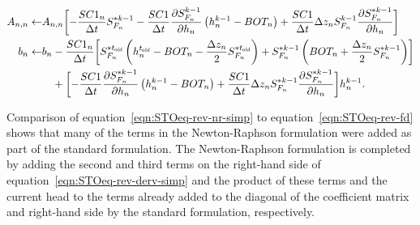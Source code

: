 \begin{equation}
	\label{eqn:STOeq-rev-nr-simp}
	\begin{split}
		A_{n,n} \leftarrow & A_{n,n} \biggl[ -\frac{SC1_n}{\Delta t}  S_{F_n}^{\ast k-1} - \frac{SC1}{\Delta t} \frac{\partial S_{F_n}^{k-1}}{\partial h_n} \left( h_n^{k-1} - BOT_n \right) + \frac{SC1}{\Delta t} \Delta z_n S_{F_n}^{k-1}  \frac{\partial S_{F_n}^{\ast k-1}}{\partial h_n} \biggr]  \\
		b_n \leftarrow & b_n - \frac{SC1_n}{\Delta t} \biggl[ S_{F_n}^{\ast t_\mathit{\kern -0.07em old}} \left( h_n^{t_\mathit{\kern -0.07em old}} - BOT_n - \frac{\Delta z_n}{2} S_{F_n}^{\ast t_\mathit{\kern -0.07em old}} \right) + S_{F_n}^{\ast k-1} \left( BOT_n + \frac{\Delta z_n}{2} S_{F_n}^{\ast k-1} \right) \biggr] \\
		& \phantom{b_n} + \biggl[ - \frac{SC1}{\Delta t} \frac{\partial S_{F_n}^{\ast k-1}}{\partial h_n} \left( h_n^{k-1} - BOT_n \right) + \frac{SC1}{\Delta t} \Delta z_n S_{F_n}^{\ast k-1}  \frac{\partial S_{F_n}^{\ast k-1}}{\partial h_n} \biggr]  h_n^{k-1} .
	\end{split}
\end{equation} 

\noindent Comparison of equation~\ref{eqn:STOeq-rev-nr-simp} to equation~\ref{eqn:STOeq-rev-fd} shows that many of the terms in the Newton-Raphson formulation were added as part of the standard formulation. The Newton-Raphson formulation is completed by adding the second and third terms on the right-hand side of equation~\ref{eqn:STOeq-rev-derv-simp} and the product of these terms and the current head to the terms already added to the diagonal of the coefficient matrix and right-hand side by the standard formulation, respectively.
